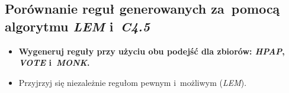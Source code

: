 \subsection{Porównanie reguł generowanych za~pomocą algorytmu \emph{LEM} i~\emph{C4.5}}

\begin{itemize}
\item \textbf{Wygeneruj reguły przy użyciu obu podejść dla zbiorów: \emph{HPAP}, \emph{VOTE} i~\emph{MONK}.}

	
	
	
	
	

\item Przyjrzyj się niezależnie regułom pewnym i~możliwym (\emph{LEM}).
\end{itemize}

